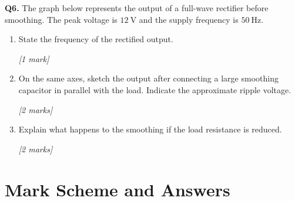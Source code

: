 \begin{tcolorbox}[colback=white, colframe=midblue, breakable]
\begin{minipage}{\linewidth}
\textbf{Q6.} The graph below represents the output of a full-wave rectifier before smoothing. The peak voltage is $12\ \text{V}$ and the supply frequency is $50\ \text{Hz}$.

\begin{enumerate}[label=(\alph*)]
  \item State the frequency of the rectified output.
  \par\hfill\textit{[1 mark]}
  \vspace{1.5cm}

  \item On the same axes, sketch the output after connecting a large smoothing capacitor in parallel with the load. Indicate the approximate ripple voltage.
  \par\hfill\textit{[2 marks]}
  \vspace{5cm}

  \item Explain what happens to the smoothing if the load resistance is reduced. 
  \par\hfill\textit{[2 marks]}
  \vspace{3cm}
\end{enumerate}
\end{minipage}

\end{tcolorbox}

\section{Mark Scheme and Answers}

